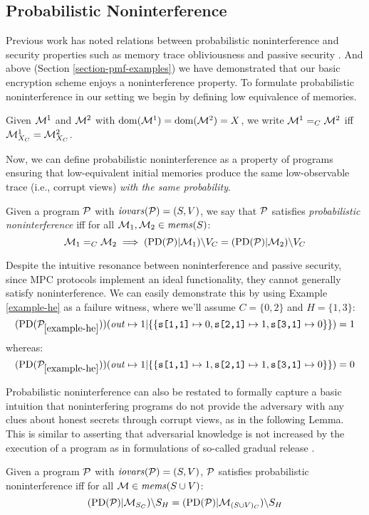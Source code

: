 \subsection{Probabilistic Noninterference}
\label{section-ni}
Previous work has noted
relations between probabilistic noninterference and security
properties such as memory trace obliviousness \cite{XXX} and passive
security \cite{XXX}. And above (Section \ref{section-pmf-examples}) we
have demonstrated that our basic encryption scheme enjoys a noninterference
property. To formulate probabilistic noninterference in
our setting we begin by defining low equivalence of memories.
\begin{definition}
  Given $\mathcal{M}^1$ and $\mathcal{M}^2$ with $\mathrm{dom}(\mathcal{M}^1) = \mathrm{dom}(\mathcal{M}^2) = X$,
  we write $\mathcal{M}^1 =_C \mathcal{M}^2$ iff $\mathcal{M}^1_{X_C} = \mathcal{M}^2_{X_C}$.
\end{definition}
Now, we can define probabilistic noninterference as a property of
programs ensuring that low-equivalent initial memories produce
the same low-observable trace (i.e., corrupt views) \emph{with the
same probability}. 
\begin{definition}
  Given a program $\mathcal{P}$ with $\mathit{iovars}(\mathcal{P}) = (S,V)$, we say that
  $\mathcal{P}$ satisfies \emph{probabilistic noninterference} iff for all
  $\mathcal{M}_1, \mathcal{M}_2 \in \mathit{mems}(S)$:
  $$\mathcal{M}_1 =_C \mathcal{M}_2 \implies
    (\mathrm{PD}(\mathcal{P})|\mathcal{M}_1)\backslash V_C =
    (\mathrm{PD}(\mathcal{P})|\mathcal{M}_2)\backslash V_C$$
\end{definition}

Despite the intuitive resonance between noninterference
and passive security, since MPC
protocols implement an ideal functionality, they cannot generally satisfy
noninterference. We can easily demonstrate this by using
Example \ref{example-he} as a failure witness, where we'll
assume $C = \{0,2\}$ and $H = \{1,3\}$:
$$
(\mathrm{PD}(\mathcal{P}_{\ref{example-he}}))({\mathit{out} \mapsto 1}|\{\{\texttt{s[1,1]} \mapsto 0, \texttt{s[2,1]} \mapsto 1, \texttt{s[3,1]} \mapsto 0 \} \})
= 1
$$
whereas:
$$
(\mathrm{PD}(\mathcal{P}_{\ref{example-he}}))({\mathit{out} \mapsto 1}|\{\{\texttt{s[1,1]} \mapsto 1, \texttt{s[2,1]} \mapsto 1, \texttt{s[3,1]} \mapsto 0 \} \})
= 0
$$

Probabilistic noninterference can also be restated to formally capture a
basic intuition that noninterfering programs do not provide
the adversary with any clues about honest secrets through corrupt
views, as in the following Lemma. This is similar to asserting that
adversarial knowledge is not increased by the execution of a program as in formulations
of so-called gradual release \cite{XXX}. 
\begin{lemma}
  Given a program $\mathcal{P}$ with $\mathit{iovars}(\mathcal{P}) = (S,V)$, 
  $\mathcal{P}$ satisfies probabilistic noninterference iff for all
  $\mathcal{M} \in \mathit{mems}(S \cup V)$:
  $$(\mathrm{PD}(\mathcal{P})|\mathcal{M}_{S_C})\backslash S_H =
    (\mathrm{PD}(\mathcal{P})|\mathcal{M}_{(S\cup V)_C})\backslash S_H $$
\end{lemma}

